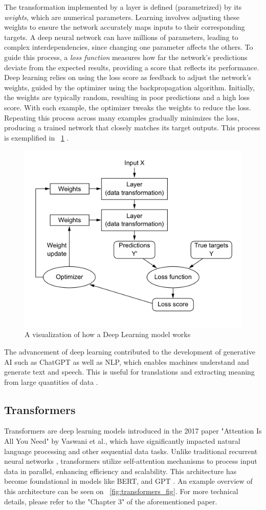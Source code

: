 \documentclass[licencjacka,en]{pracamgr}
\begin{document}
The transformation implemented by a layer is defined (parametrized) by its \textit{weights}, which are numerical parameters. Learning involves adjusting these weights to ensure the network accurately maps inputs to their corresponding targets. A deep neural network can have millions of parameters, leading to complex interdependencies, since changing one parameter affects the others. To guide this process, a \textit{loss function} measures how far the network's predictions deviate from the expected results, providing a score that reflects its performance. Deep learning relies on using the loss score as feedback to adjust the network's weights, guided by the optimizer using the backpropagation algorithm. Initially, the weights are typically random, resulting in poor predictions and a high loss score. With each example, the optimizer tweaks the weights to reduce the loss. Repeating this process across many examples gradually minimizes the loss, producing a trained network that closely matches its target outputs. This process is exemplified in ~\ref{fig:nn_function} \cite{francuz}.

\begin{figure}
    \centering
    \includegraphics[width=0.5\linewidth]{bachelor_images/nn_function.png}
    \caption{A visualization of how a Deep Learning model works \cite{francuz}}
    \label{fig:nn_function}
\end{figure}

The advancement of deep learning contributed to the development of generative AI such as ChatGPT as well as NLP, which enables machines understand and generate text and speech. This is useful for translations and extracting meaning from large quantities of data \cite{ibm_dl}.

\subsection{Transformers}
Transformers are deep learning models introduced in the 2017 paper "Attention Is All You Need" \cite{attention} by Vaswani et al., which have significantly impacted natural language processing and other sequential data tasks. Unlike traditional recurrent neural networks \cite{RNN}, transformers utilize self-attention mechanisms to process input data in parallel, enhancing efficiency and scalability. This architecture has become foundational in models like BERT, and GPT \cite{medium_t}. An example overview of this architecture can be seen on ~\ref{fig:transformers_fig}. For more technical details, please refer to the "Chapter 3" of the aforementioned paper.
\end{document}
